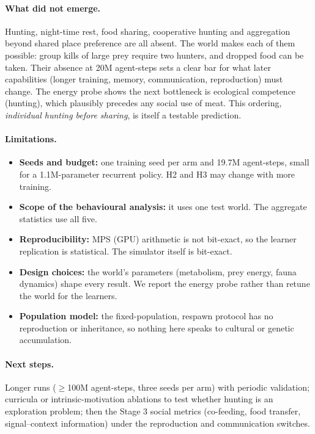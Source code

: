 \documentclass[10pt]{article}
\begin{document}
\paragraph{What did not emerge.} Hunting, night-time rest, food sharing, cooperative hunting and aggregation beyond
shared place preference are all absent. The world makes each of them possible: group kills of large prey require
two hunters, and dropped food can be taken. Their absence at 20M agent-steps sets a clear bar for what later
capabilities (longer training, memory, communication, reproduction) must change. The energy probe shows the next
bottleneck is ecological competence (hunting), which plausibly precedes any social use of meat. This ordering,
\emph{individual hunting before sharing}, is itself a testable prediction.

\paragraph{Limitations.}
\begin{itemize}
  \item \textbf{Seeds and budget:} one training seed per arm and 19.7M agent-steps, small for a 1.1M-parameter
  recurrent policy. H2 and H3 may change with more training.
  \item \textbf{Scope of the behavioural analysis:} it uses one test world. The aggregate statistics use all five.
  \item \textbf{Reproducibility:} MPS (GPU) arithmetic is not bit-exact, so the learner replication is statistical.
  The simulator itself is bit-exact.
  \item \textbf{Design choices:} the world's parameters (metabolism, prey energy, fauna dynamics) shape every result.
  We report the energy probe rather than retune the world for the learners.
  \item \textbf{Population model:} the fixed-population, respawn protocol has no reproduction or inheritance, so
  nothing here speaks to cultural or genetic accumulation.
\end{itemize}

\paragraph{Next steps.} Longer runs ($\geq$100M agent-steps, three seeds per arm) with periodic validation; curricula
or intrinsic-motivation ablations to test whether hunting is an exploration problem; then the Stage 3 social metrics
(co-feeding, food transfer, signal--context information) under the reproduction and communication switches.
\end{document}
